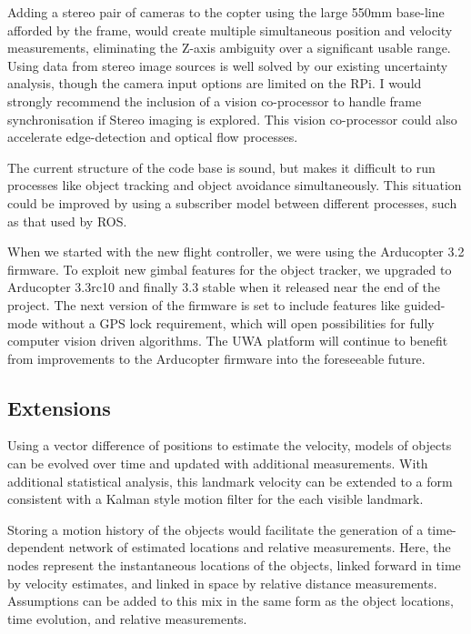 \documentclass{article}
\begin{document}
  Adding a stereo pair of cameras to the copter using the large 550mm base-line afforded by the frame, would create multiple simultaneous position and velocity measurements, eliminating the Z-axis ambiguity over a significant usable range.  
  Using data from stereo image sources is well solved by our existing uncertainty analysis, though the camera input options are limited on the RPi. I would strongly recommend the inclusion of a vision co-processor to handle frame synchronisation if Stereo imaging is explored.  This vision co-processor could also accelerate edge-detection and optical flow processes.

  The current structure of the code base is sound, but makes it difficult to run processes like object tracking and object avoidance simultaneously.  This situation could be improved by using a subscriber model between different processes, such as that used by ROS.

  When we started with the new flight controller, we were using the Arducopter 3.2 firmware. To exploit new gimbal features for the object tracker, we upgraded to Arducopter 3.3rc10 and finally 3.3 stable when it released near the end of the project.  The next version of the firmware is set to include features like guided-mode without a GPS lock requirement, which will open possibilities for fully computer vision driven algorithms.  The UWA platform will continue to benefit from improvements to the Arducopter firmware into the foreseeable future.


  \subsection{Extensions}


    Using a vector difference of positions to estimate the velocity, models of objects can be evolved over time and updated with additional measurements.  With additional statistical analysis, this landmark velocity can be extended to a form consistent with a Kalman style motion filter for the each visible landmark.

    Storing a motion history of the objects would facilitate the generation of a time-dependent network of estimated locations and relative measurements.
    Here, the nodes represent the instantaneous locations of the objects, linked forward in time by velocity estimates, and linked in space by relative distance measurements.  Assumptions can be added to this mix in the same form as the object locations, time evolution, and relative measurements.
\end{document}

